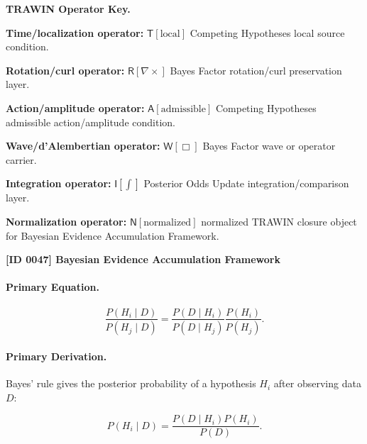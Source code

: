 \par\vspace{0.45\baselineskip}
\noindent\begin{minipage}[t]{\linewidth}
\begingroup
\small
\raggedright
\textbf{TRAWIN Operator Key.}\par
\noindent\textbf{Time/localization operator:} $\mathsf{T}\!\left[\mathrm{local}\right]$ Competing Hypotheses local source condition.\par
\noindent\textbf{Rotation/curl operator:} $\mathsf{R}\!\left[\nabla\times\right]$ Bayes Factor rotation/curl preservation layer.\par
\noindent\textbf{Action/amplitude operator:} $\mathsf{A}\!\left[\mathrm{admissible}\right]$ Competing Hypotheses admissible action/amplitude condition.\par
\noindent\textbf{Wave/d'Alembertian operator:} $\mathsf{W}\!\left[\Box\right]$ Bayes Factor wave or operator carrier.\par
\noindent\textbf{Integration operator:} $\mathsf{I}\!\left[\int\right]$ Posterior Odds Update integration/comparison layer.\par
\noindent\textbf{Normalization operator:} $\mathsf{N}\!\left[\mathrm{normalized}\right]$ normalized TRAWIN closure object for Bayesian Evidence Accumulation Framework.\par
\endgroup
\end{minipage}

\clearpage
\noindent\textbf{[ID 0047] Bayesian Evidence Accumulation Framework}\par
\vspace{0.35em}
\paragraph{Primary Equation.}
\begin{equation}
\frac{P(H_i\mid D)}
{P(H_j\mid D)}
=
\frac{P(D\mid H_i)}
{P(D\mid H_j)}
\frac{P(H_i)}
{P(H_j)} .
\end{equation}

\paragraph{Primary Derivation.}
Bayes' rule gives the posterior probability of a hypothesis $H_i$ after observing data $D$:

\begin{equation}
P(H_i\mid D)
=
\frac{P(D\mid H_i)P(H_i)}
{P(D)} .
\end{equation}

